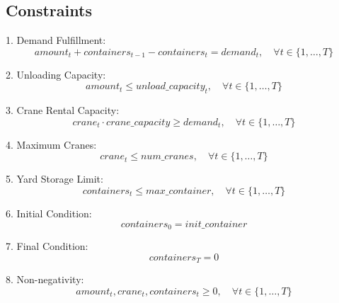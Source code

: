 \documentclass{article}
\begin{document}
\subsection*{Constraints}

1. Demand Fulfillment:
\[
amount_t + containers_{t-1} - containers_t = demand_t, \quad \forall t \in \{1, \ldots, T\}
\]

2. Unloading Capacity:
\[
amount_t \leq unload\_capacity_t, \quad \forall t \in \{1, \ldots, T\}
\]

3. Crane Rental Capacity:
\[
crane_t \cdot crane\_capacity \geq demand_t, \quad \forall t \in \{1, \ldots, T\}
\]

4. Maximum Cranes:
\[
crane_t \leq num\_cranes, \quad \forall t \in \{1, \ldots, T\}
\]

5. Yard Storage Limit:
\[
containers_t \leq max\_container, \quad \forall t \in \{1, \ldots, T\}
\]

6. Initial Condition:
\[
containers_0 = init\_container
\]

7. Final Condition:
\[
containers_T = 0
\]

8. Non-negativity:
\[
amount_t, crane_t, containers_t \geq 0, \quad \forall t \in \{1, \ldots, T\}
\]
\end{document}
